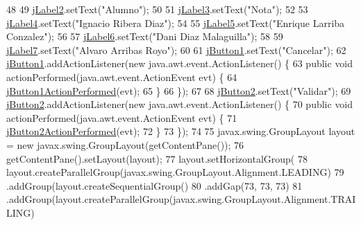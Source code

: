 \begin{DoxyCode}
48 
49         \mbox{\hyperlink{classsoftware_1_1ponernotas_ab381c20a9538313f7d4a5b39b0a96325}{jLabel2}}.setText(\textcolor{stringliteral}{"Alumno"});
50 
51         \mbox{\hyperlink{classsoftware_1_1ponernotas_a35f1e77968f139680ed7404f94dada6f}{jLabel3}}.setText(\textcolor{stringliteral}{"Nota"});
52 
53         \mbox{\hyperlink{classsoftware_1_1ponernotas_a85fb8af1244048f39a9d8864e8ef6744}{jLabel4}}.setText(\textcolor{stringliteral}{"Ignacio Ribera Diaz"});
54 
55         \mbox{\hyperlink{classsoftware_1_1ponernotas_ab1d9cabe505eb0024a31ce142ab2ca0d}{jLabel5}}.setText(\textcolor{stringliteral}{"Enrique Larriba Conzalez"});
56 
57         \mbox{\hyperlink{classsoftware_1_1ponernotas_ac94bb41bd989a69788d89b0522ecba91}{jLabel6}}.setText(\textcolor{stringliteral}{"Dani Diaz Malaguilla"});
58 
59         \mbox{\hyperlink{classsoftware_1_1ponernotas_ae60c32ed6ba0e002b935d38c6d9378a3}{jLabel7}}.setText(\textcolor{stringliteral}{"Alvaro Arribas Royo"});
60 
61         \mbox{\hyperlink{classsoftware_1_1ponernotas_ab5d7404242d2345a5e4b00f8816b4834}{jButton1}}.setText(\textcolor{stringliteral}{"Cancelar"});
62         \mbox{\hyperlink{classsoftware_1_1ponernotas_ab5d7404242d2345a5e4b00f8816b4834}{jButton1}}.addActionListener(\textcolor{keyword}{new} java.awt.event.ActionListener() \{
63             \textcolor{keyword}{public} \textcolor{keywordtype}{void} actionPerformed(java.awt.event.ActionEvent evt) \{
64                 \mbox{\hyperlink{classsoftware_1_1ponernotas_a99036ee7583ce0aca853962f41f7a5d2}{jButton1ActionPerformed}}(evt);
65             \}
66         \});
67 
68         \mbox{\hyperlink{classsoftware_1_1ponernotas_a5c280378d6fe6477170e9ede3ac8ae98}{jButton2}}.setText(\textcolor{stringliteral}{"Validar"});
69         \mbox{\hyperlink{classsoftware_1_1ponernotas_a5c280378d6fe6477170e9ede3ac8ae98}{jButton2}}.addActionListener(\textcolor{keyword}{new} java.awt.event.ActionListener() \{
70             \textcolor{keyword}{public} \textcolor{keywordtype}{void} actionPerformed(java.awt.event.ActionEvent evt) \{
71                 \mbox{\hyperlink{classsoftware_1_1ponernotas_a1b22c329acda989f58386bdfe78f9ff4}{jButton2ActionPerformed}}(evt);
72             \}
73         \});
74 
75         javax.swing.GroupLayout layout = \textcolor{keyword}{new} javax.swing.GroupLayout(getContentPane());
76         getContentPane().setLayout(layout);
77         layout.setHorizontalGroup(
78             layout.createParallelGroup(javax.swing.GroupLayout.Alignment.LEADING)
79             .addGroup(layout.createSequentialGroup()
80                 .addGap(73, 73, 73)
81                 .addGroup(layout.createParallelGroup(javax.swing.GroupLayout.Alignment.TRAILING)

\end{DoxyCode}
